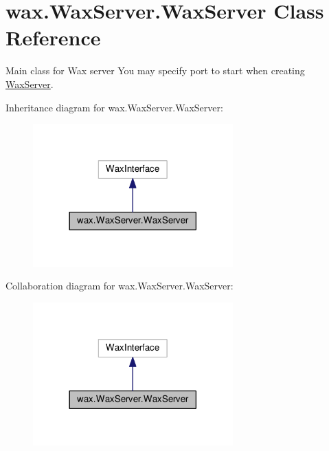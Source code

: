 \hypertarget{classwax_1_1WaxServer_1_1WaxServer}{}\section{wax.\+Wax\+Server.\+Wax\+Server Class Reference}
\label{classwax_1_1WaxServer_1_1WaxServer}


Main class for Wax server You may specify port to start when creating \hyperlink{classwax_1_1WaxServer_1_1WaxServer}{Wax\+Server}.  




Inheritance diagram for wax.\+Wax\+Server.\+Wax\+Server\+:\nopagebreak
\begin{figure}[H]
\begin{center}
\leavevmode
\includegraphics[width=218pt]{classwax_1_1WaxServer_1_1WaxServer__inherit__graph}
\end{center}
\end{figure}


Collaboration diagram for wax.\+Wax\+Server.\+Wax\+Server\+:\nopagebreak
\begin{figure}[H]
\begin{center}
\leavevmode
\includegraphics[width=218pt]{classwax_1_1WaxServer_1_1WaxServer__coll__graph}
\end{center}
\end{figure}
